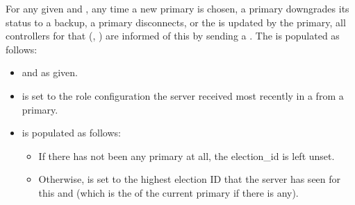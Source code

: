 \documentclass[11pt]{article}
\begin{document}
{%
\noindent{}For any given  and , any time a new primary is chosen, a
primary downgrades its status to a backup, a primary disconnects, or the
 is updated by the primary, all controllers for that
(, ) are informed of this by sending a
. The  is populated as follows:%

\begin{itemize}%

\item{}
 and  as given.%

\item{}
 is set to the role configuration the server received most
recently in a  from a primary.%

\item{}
 is populated as follows:%

\begin{itemize}%

\item{}
If there has not been any primary at all, the election\_id is left unset.%

\item{}
Otherwise,  is set to the highest election ID that the server
has seen for this  and  (which is the  of
the current primary if there is any).%
\end{itemize}%


\end{itemize}}
\end{document}
